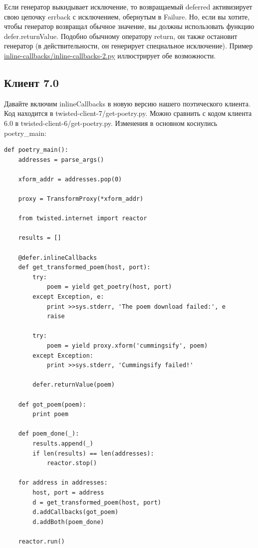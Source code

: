 Если генератор выкидывает исключение, 
то возвращаемый deferred активизирует свою 
цепочку errback с исключением, обернутым в Failure. 
Но, если вы хотите, чтобы генератор возвращал 
обычное значение, вы должны использовать функцию 
defer.returnValue. Подобно обычному оператору return, 
он также остановит генератор (в действительности, он 
генерирует специальное исключение). Пример 
\href{http://github.com/jdavisp3/twisted-intro/blob/master/inline-callbacks/inline-callbacks-2.py#L1}{inline-callbacks/inline-callbacks-2.py} иллюстрирует 
обе возможности.

\subsection{Клиент 7.0}

Давайте включим inlineCallbacks в новую версию нашего поэтического 
клиента. Код находится в twisted-client-7/get-poetry.py. 
Можно сравнить с кодом клиента 6.0 в twisted-client-6/get-poetry.py. 
Изменения в основном коснулись poetry\_main:

\begin{scriptsize}\begin{verbatim}
def poetry_main():
    addresses = parse_args()

    xform_addr = addresses.pop(0)

    proxy = TransformProxy(*xform_addr)

    from twisted.internet import reactor

    results = []

    @defer.inlineCallbacks
    def get_transformed_poem(host, port):
        try:
            poem = yield get_poetry(host, port)
        except Exception, e:
            print >>sys.stderr, 'The poem download failed:', e
            raise

        try:
            poem = yield proxy.xform('cummingsify', poem)
        except Exception:
            print >>sys.stderr, 'Cummingsify failed!'

        defer.returnValue(poem)

    def got_poem(poem):
        print poem

    def poem_done(_):
        results.append(_)
        if len(results) == len(addresses):
            reactor.stop()

    for address in addresses:
        host, port = address
        d = get_transformed_poem(host, port)
        d.addCallbacks(got_poem)
        d.addBoth(poem_done)

    reactor.run()
\end{verbatim}\end{scriptsize}



